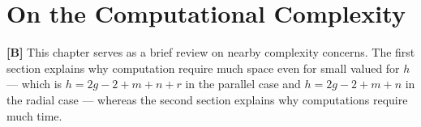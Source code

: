 \chapter{On the Computational Complexity}
\label{complexity}
{\bf [B]} This chapter serves as a brief review on nearby complexity concerns.
The first section explains why computation require much space even for small valued for $h$ --- which is $h = 2g-2+m+n+r$ in the parallel case and $h=2g-2+m+n$ in the radial case ---
whereas the second section explains why computations require much time.


